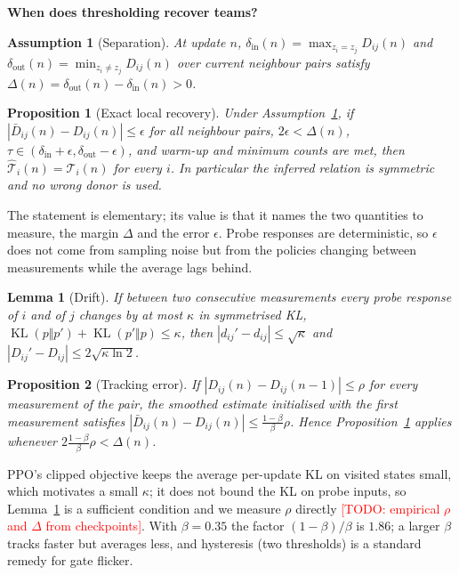 \documentclass{article}
\newtheorem{proposition}{Proposition}
\newtheorem{lemma}{Lemma}
\newtheorem{assumption}{Assumption}
\theoremstyle{remark}
\newcommand{\todo}[1]{\textcolor{red}{[TODO: #1]}}
\newcommand{\KL}{\operatorname{KL}}
\begin{document}
\textbf{When does thresholding recover teams?}
\begin{assumption}[Separation]
\label{as:separation}
At update $n$, $\delta_{\mathrm{in}}(n)=\max_{z_i=z_j}D_{ij}(n)$ and $\delta_{\mathrm{out}}(n)=\min_{z_i\ne z_j}D_{ij}(n)$ over current
neighbour pairs satisfy $\Delta(n)=\delta_{\mathrm{out}}(n)-\delta_{\mathrm{in}}(n)>0$.
\end{assumption}
\begin{proposition}[Exact local recovery]
\label{prop:recovery}
Under Assumption~\ref{as:separation}, if $|\bar D_{ij}(n)-D_{ij}(n)|\le\epsilon$ for all neighbour pairs, $2\epsilon<\Delta(n)$,
$\tau\in(\delta_{\mathrm{in}}+\epsilon,\delta_{\mathrm{out}}-\epsilon)$, and warm-up and minimum counts are met, then
$\hat{\mathcal{T}}_i(n)=\mathcal{T}_i(n)$ for every $i$. In particular the inferred relation is symmetric and no wrong donor
is used.
\end{proposition}
The statement is elementary; its value is that it names the two quantities to measure, the margin $\Delta$ and the error
$\epsilon$. Probe responses are deterministic, so $\epsilon$ does not come from sampling noise but from the policies changing
between measurements while the average lags behind.
\begin{lemma}[Drift]
\label{lem:drift}
If between two consecutive measurements every probe response of $i$ and of $j$ changes by at most $\kappa$ in symmetrised KL,
$\KL(p\Vert p')+\KL(p'\Vert p)\le\kappa$, then $|d_{ij}'-d_{ij}|\le\sqrt{\kappa}$ and $|D_{ij}'-D_{ij}|\le2\sqrt{\kappa\ln 2}$.
\end{lemma}
\begin{proposition}[Tracking error]
\label{prop:tracking}
If $|D_{ij}(n)-D_{ij}(n-1)|\le\rho$ for every measurement of the pair, the smoothed estimate initialised with the first
measurement satisfies $|\bar D_{ij}(n)-D_{ij}(n)|\le\frac{1-\beta}{\beta}\rho$. Hence Proposition~\ref{prop:recovery} applies
whenever $2\frac{1-\beta}{\beta}\rho<\Delta(n)$.
\end{proposition}
PPO's clipped objective keeps the average per-update KL on visited states small, which motivates a small $\kappa$; it does not
bound the KL on probe inputs, so Lemma~\ref{lem:drift} is a sufficient condition and we measure $\rho$ directly
\todo{empirical $\rho$ and $\Delta$ from checkpoints}. With $\beta=0.35$ the factor $(1-\beta)/\beta$ is $1.86$; a larger $\beta$
tracks faster but averages less, and hysteresis (two thresholds) is a standard remedy for gate flicker.
\end{document}
